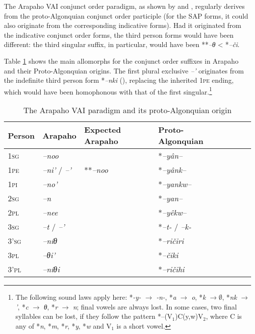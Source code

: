 \documentclass[twoside,a4paper,11pt]{article}
\newcommand{\ipa}[1]{{\phon\textit{#1}}}
\newcommand{\sg}{\textsc{sg}}
\newcommand{\pl}{\textsc{pl}}
\newcommand{\grise}[1]{\cellcolor{lightgray}\textbf{#1}}
\newcommand{\pli}{\textsc{pi}}
\newcommand{\pe}{\textsc{pe}}
\begin{document}
The Arapaho VAI conjunct order paradigm, as shown by \citet[16-7]{goddard65arapaho} and \citet{goddard15morpho}, regularly derives from the proto-Algonquian conjunct order participle (for the SAP forms, it could also originate from the corresponding indicative forms). Had it originated from the indicative conjunct order forms, the third person forms would have been different: the third singular suffix, in particular, would have been **\ipa{--θ} < *\ipa{--či}.

Table \ref{tab:arapaho.vai} shows the main  allomorphs for the conjunct order suffixes in Arapaho and their Proto-Algonquian origins. The first plural exclusive \ipa{--'} originates from the indefinite third person form *\ipa{--nki} (\citealt{goddard98morphology.arapaho, goddard15morpho}), replacing the inherited 1\pe{} ending, which would have been homophonous with that of the first singular.\footnote{The following sound laws apply here: *\ipa{-y-} $\rightarrow$ \ipa{-n-}, *\ipa{a} $\rightarrow$ \ipa{o}, *\ipa{k} $\rightarrow \emptyset $, *\ipa{nk} $\rightarrow$ \ipa{'}, *\ipa{c} $\rightarrow$ \ipa{θ},  *\ipa{r} $\rightarrow$ \ipa{n}; final vowels are always lost. In some cases, two final syllables can be lost, if they follow the pattern *--(V${_1}$)C(y,w)V${_2}$, where C is any of *\ipa{n}, *\ipa{m}, *\ipa{r}, *\ipa{y}, *\ipa{w} and V${_1}$ is a short vowel. }


\begin{table}[H]
\caption{The Arapaho VAI paradigm and its proto-Algonquian origin}
\centering \label{tab:arapaho.vai}
\begin{tabular}{lllllll}
\toprule
Person &   Arapaho    & Expected Arapaho &Proto-Algonquian\\
\midrule
1\sg{}& 	\ipa{--noo} & & 	*\ipa{--yân--} & 	\\	
1\pe{} & 	\ipa{--ni'} /  	\ipa{--'} \grise{} & **\ipa{--noo}	&	 *\ipa{--yânk--}	 \\	
1\pli{} & 	\ipa{--no'} & 	 	&	*\ipa{--yankw--} & 	\\	
\midrule
2\sg{}& 	\ipa{--n} & 	 &	*\ipa{--yan--} & 	\\	
2\pl{}& 	\ipa{--nee} & 	 & 		*\ipa{--yêkw--} & 	\\	
\midrule
3\sg{} & 	\ipa{--t} /	\ipa{--'} & 	&	*\ipa{--t-} / \ipa{--k-}& 	\\	
3'\sg{} & 	\ipa{--níθ} &  	&	*\ipa{--ričiri} & 	\\	
3\pl{}& 	\ipa{--θi'} &  	&	*\ipa{--čiki} 	\\	
3'\pl{}& 	\ipa{--níθi} & 	 &		*\ipa{--ričihi} 	\\	
\bottomrule
\end{tabular}
\end{table}
\end{document}
